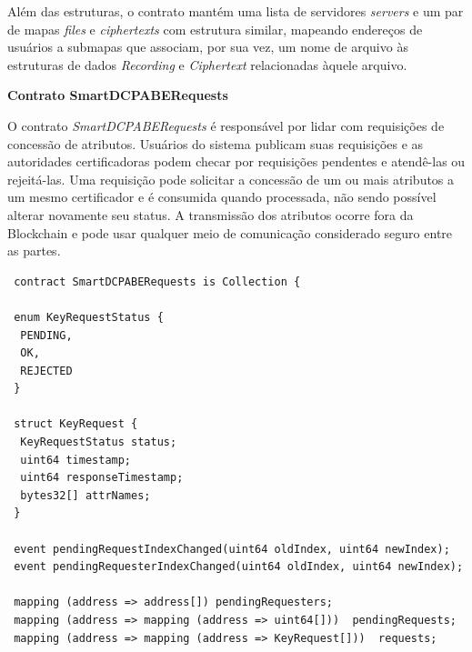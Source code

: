 \documentclass[a4paper,11pt]{article}
\begin{document}
Além das estruturas, o contrato mantém uma lista de servidores \emph{servers} e um par de mapas \emph{files} e \emph{ciphertexts} com estrutura similar, mapeando endereços de usuários a submapas que associam, por sua vez, um nome de arquivo às estruturas de dados \emph{Recording} e \emph{Ciphertext} relacionadas àquele arquivo. %

\textbf{Contrato SmartDCPABERequests}



O contrato \emph{SmartDCPABERequests}  é responsável por lidar com requisições de concessão de atributos.
Usuários do sistema publicam suas requisições e as autoridades certificadoras podem checar por requisições pendentes e atendê-las ou rejeitá-las.
Uma requisição pode solicitar a concessão de um ou mais atributos a um mesmo certificador e é consumida quando processada, não sendo possível alterar novamente seu status.
A transmissão dos atributos ocorre fora da Blockchain e pode usar qualquer meio de comunicação considerado seguro entre as partes.


\begin{lstlisting}
 contract SmartDCPABERequests is Collection {

 enum KeyRequestStatus {
  PENDING,
  OK,
  REJECTED
 }

 struct KeyRequest {
  KeyRequestStatus status;
  uint64 timestamp;
  uint64 responseTimestamp;
  bytes32[] attrNames;
 }

 event pendingRequestIndexChanged(uint64 oldIndex, uint64 newIndex);
 event pendingRequesterIndexChanged(uint64 oldIndex, uint64 newIndex);

 mapping (address => address[]) pendingRequesters;
 mapping (address => mapping (address => uint64[]))  pendingRequests;
 mapping (address => mapping (address => KeyRequest[]))  requests;
\end{lstlisting}
\end{document}
